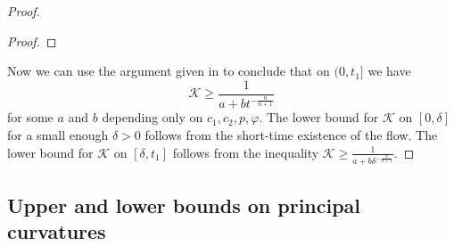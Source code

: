 \documentclass{amsart}
\theoremstyle{definition}
\theoremstyle{remark}
\numberwithin{equation}{section}
\begin{document}
\begin{proof}
{\begin{proof}
\end{proof}}
Now we can use the argument given in \cite[Lemma 2.3]{Ivaki-Stancu} to conclude that on $(0,t_1]$ we have
$$\mathcal{K}\geq \frac{1}{a+b t^{-\frac{n}{n+1}}}$$ for some $a$ and $b$ depending only on $c_1,c_2,p,\varphi.$
The lower bound for $\mathcal{K}$ on $[0,\delta]$ for a small enough $\delta>0$ follows from the short-time existence of the flow. The lower bound for $\mathcal{K}$ on $[\delta,t_1]$ follows from the inequality $\mathcal{K}\geq \frac{1}{a+b \delta^{-\frac{n}{n+1}}}.$
\end{proof}

\subsection{Upper and lower bounds on principal curvatures}
\label{subsec:principal-curvature-bounds}
\end{document}
